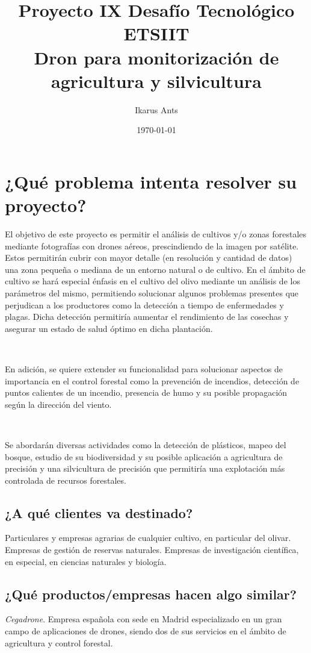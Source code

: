\documentclass[11pt,spanish]{article} %
\title{Proyecto IX Desafío Tecnológico ETSIIT\\
		Dron para monitorización de agricultura y silvicultura }
\author{Ikarus Ants}
\date{\today}
\begin{document}
\BgThispage
\maketitle
\tableofcontents %
\newpage
\setlength\parindent{0pt} %



\section{¿Qué problema intenta resolver su proyecto?}

El objetivo de este proyecto es permitir el análisis de cultivos y/o zonas forestales mediante fotografías con drones aéreos, prescindiendo de la imagen por satélite. Estos permitirán cubrir con mayor detalle (en resolución y cantidad de datos) una zona pequeña o mediana de un entorno natural o de cultivo. 
En el ámbito de cultivo se hará especial énfasis en el cultivo del olivo mediante un análisis de los parámetros del mismo, permitiendo solucionar algunos problemas presentes que perjudican a los productores como la detección a tiempo de enfermedades y plagas. Dicha detección permitiría aumentar el rendimiento de las cosechas y asegurar un estado de salud óptimo en dicha plantación. 

\

En adición, se quiere extender su funcionalidad para solucionar aspectos de importancia en el control forestal como la prevención de incendios, detección de puntos calientes de un incendio, presencia de humo y su posible propagación según la dirección del viento.

\

Se abordarán diversas actividades como la detección de plásticos, mapeo del bosque, estudio de su biodiversidad y su posible aplicación a agricultura de precisión y una silvicultura de precisión que permitiría una explotación más controlada de recursos forestales.


\subsection{¿A qué clientes va destinado?}
Particulares y empresas agrarias de cualquier cultivo, en particular del olivar.
Empresas de gestión de reservas naturales.
Empresas de investigación científica, en especial, en ciencias naturales y biología.


\subsection{¿Qué productos/empresas hacen algo similar?}
\textit{Cegadrone}. Empresa española con sede en Madrid especializado en un gran campo de aplicaciones de drones, siendo dos de sus servicios en el ámbito de agricultura y control forestal. 
\end{document}
